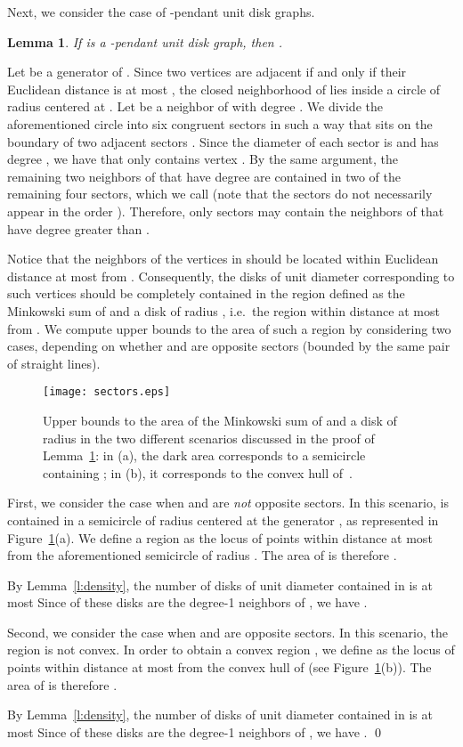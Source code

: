 \documentclass[preprint,12pt]{elsarticle}
\newtheorem{lem}[thm]{Lemma}
\begin{document}
Next, we consider the case of -pendant unit disk graphs.

\begin{lem} \label{l:3l-pendant}
If  is a -pendant unit disk graph, then .
\end{lem}
\begin{pf}
Let  be a generator of . Since two vertices are adjacent if and only if their Euclidean distance is at most , the closed neighborhood of  lies inside a circle of radius  centered at . Let  be a neighbor of  with \linebreak degree . We divide the aforementioned circle into six congruent sectors  in such a way that  sits on the boundary of two adjacent sectors . Since the diameter of each sector is  and  has degree , we have that  only contains vertex . By the same argument, the remaining two neighbors of  that have degree  are contained in two of the remaining four sectors, which we call  (note that the sectors do not necessarily appear in the order ). Therefore, only sectors  may contain the neighbors of  that have degree greater than .

Notice that the neighbors of the vertices in  should be located within Euclidean distance at most  from . Consequently, the disks of unit diameter corresponding to such vertices should be completely contained in the region defined as the Minkowski sum of  and a disk of radius , i.e.~the region within distance at most  from . We compute upper bounds to the area of such a region by considering two cases, depending on whether  and  are opposite sectors (bounded by the same pair of straight lines).

\begin{figure}[t]
 \centering
 \texttt{[image: sectors.eps]}
 \caption{\label{f:sectors}Upper bounds to the area of the Minkowski sum of  and a disk of radius  in the two different scenarios discussed in the proof of Lemma~\ref{l:3l-pendant}: in (a), the dark area corresponds to a semicircle containing ; in (b), it corresponds to the convex hull of~.}
\end{figure}

First, we consider the case when  and  are \emph{not} opposite sectors. In this scenario,  is contained in a semicircle of radius  centered at the generator , as represented in Figure~\ref{f:sectors}(a). We define a region  as the locus of points within distance at most  from the aforementioned semicircle of radius . The area  of  is therefore .

By Lemma~\ref{l:density}, the number of disks of unit diameter contained in  is at most 
Since  of these disks are the degree-1 neighbors of , we have .

Second, we consider the case when  and  are opposite sectors. In this scenario, the region  is not convex. In order to obtain a convex region , we define  as the locus of points within distance at most  from the convex hull of  (see Figure~\ref{f:sectors}(b)). The area  of  is therefore .

By Lemma~\ref{l:density}, the number of disks of unit diameter contained in  is at most 
Since  of these disks are the degree-1 neighbors of , we have .
\qed
\end{pf}
\end{document}
